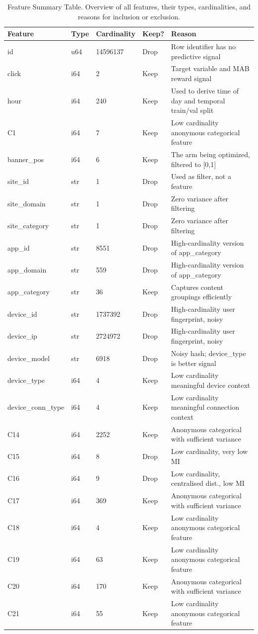\documentclass[12pt]{article}
\begin{document}
\begin{table}[H]
\centering
\small
\begin{tabular}{llll>{\raggedright\arraybackslash}p{5cm}}
\toprule
\textbf{Feature} & \textbf{Type} & \textbf{Cardinality} & \textbf{Keep?} & \textbf{Reason} \\
\midrule
id & u64 & 14596137 & Drop & Row identifier has no predictive signal \\
click & i64 & 2 & Keep & Target variable and MAB reward signal \\
hour & i64 & 240 & Keep & Used to derive time of day and temporal train/val split \\
C1 & i64 & 7 & Keep & Low cardinality anonymous categorical feature \\
banner\_pos & i64 & 6 & Keep & The arm being optimized, filtered to [0,1] \\
site\_id & str & 1 & Drop & Used as filter, not a feature \\
site\_domain & str & 1 & Drop & Zero variance after filtering \\
site\_category & str & 1 & Drop & Zero variance after filtering \\
app\_id & str & 8551 & Drop & High-cardinality version of app\_category \\
app\_domain & str & 559 & Drop & High-cardinality version of app\_category \\
app\_category & str & 36 & Keep & Captures content groupings efficiently \\
device\_id & str & 1737392 & Drop & High-cardinality user fingerprint, noisy \\
device\_ip & str & 2724972 & Drop & High-cardinality user fingerprint, noisy \\
device\_model & str & 6918 & Drop & Noisy hash; device\_type is better signal \\
device\_type & i64 & 4 & Keep & Low cardinality meaningful device context \\
device\_conn\_type & i64 & 4 & Keep & Low cardinality meaningful connection context \\
C14 & i64 & 2252 & Keep & Anonymous categorical with sufficient variance \\
C15 & i64 & 8 & Drop & Low cardinality, very low MI \\
C16 & i64 & 9 & Drop & Low cardinality, centralised dist., low MI \\
C17 & i64 & 369 & Keep & Anonymous categorical with sufficient variance \\
C18 & i64 & 4 & Keep & Low cardinality anonymous categorical feature \\
C19 & i64 & 63 & Keep & Low cardinality anonymous categorical feature \\
C20 & i64 & 170 & Keep & Anonymous categorical with sufficient variance \\
C21 & i64 & 55 & Keep & Low cardinality anonymous categorical feature \\
\bottomrule
\end{tabular}
\caption{Feature Summary Table. Overview of all features, their types, cardinalities, and reasons for inclusion or exclusion.}
\label{tab:features_summary}
\end{table}
\end{document}
